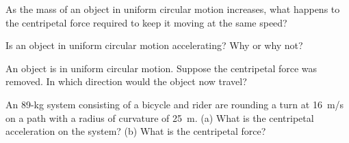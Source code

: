 \documentclass[main.tex]{subfiles}
\begin{document}
\begin{exercise} \label{M6NkHB}
    As the mass of an object in uniform circular motion increases, what happens to the centripetal force required to keep it moving at the same speed?
\end{exercise}

\begin{exercise} \label{IAjJBC}
    Is an object in uniform circular motion accelerating? Why or why not?
\end{exercise}

\begin{exercise} \label{G8I4Up}
    An object is in uniform circular motion. Suppose the centripetal force was removed. In which direction would the object now travel?
\end{exercise}

\begin{exercise} \label{Kv8Old}
An 89-kg system consisting of a bicycle and rider are rounding a turn at \SI{16}{m/s} on a path with a radius of curvature of \SI{25}{m}. (a) What is the centripetal acceleration on the system? (b) What is the centripetal force?
\end{exercise}


\clearpage
\end{document}
